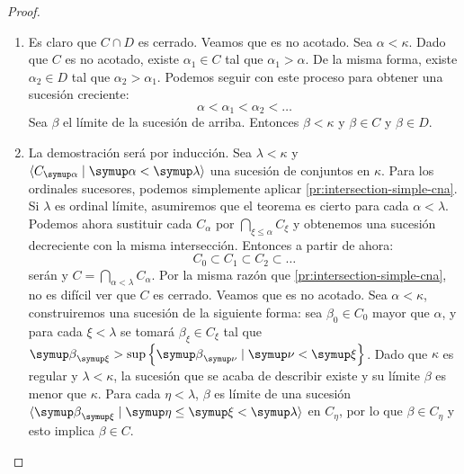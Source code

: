 \begin{proof}\phantom{a}
    \begin{enumerate}[label=(\roman*)]
        \item\label{pr:intersection-simple-cna}
            Es claro que $C\cap D$ es cerrado. Veamos que es no acotado.
            Sea $\alpha<\kappa$. Dado que $C$ es no acotado, existe $\alpha_1\in C$
            tal que $\alpha_1 > \alpha$. De la misma forma, existe $\alpha_2\in D$
            tal que $\alpha_2 > \alpha_1$. Podemos seguir con este proceso para obtener
            una sucesión creciente:
            \[
                \alpha < \alpha_1 < \alpha_2 < \dots
            \]
            Sea $\beta$ el límite de la sucesión de arriba.
            Entonces $\beta < \kappa$ y $\beta\in C$ y $\beta\in D$.


        \item\label{pr:intersection-cna}
            La demostración será por inducción.
            Sea $\lambda<\kappa$ y $\seq{C_\alpha\mid\alpha<\lambda}$
            una sucesión de conjuntos \cna{} en $\kappa$.
            Para los ordinales sucesores, podemos simplemente aplicar
            \ref{pr:intersection-simple-cna}.
            Si $\lambda$ es ordinal límite, asumiremos que el teorema
            es cierto para cada $\alpha<\lambda$. Podemos ahora sustituir
            cada $C_\alpha$ por $\bigcap_{\xi\leq\alpha} C_\xi$ y obtenemos
            una sucesión decreciente con la misma intersección. Entonces a partir de ahora:
            \[
                C_0 \subset C_1 \subset C_2 \subset \dots
            \]
            serán \cna{} y $C = \bigcap_{\alpha<\lambda} C_\alpha$.
            Por la misma razón que \ref{pr:intersection-simple-cna}, no es difícil
            ver que $C$ es cerrado. Veamos que es no acotado. Sea $\alpha<\kappa$,
            construiremos una sucesión de la siguiente forma: sea $\beta_0\in C_0$ mayor que
            $\alpha$, y para cada $\xi<\lambda$ se tomará $\beta_\xi\in C_\xi$
            tal que $\beta_\xi > \sup\set{\beta_\nu\mid\nu<\xi}$.
            Dado que $\kappa$ es regular y $\lambda<\kappa$, la sucesión que se acaba de
            describir existe y su límite $\beta$ es menor que $\kappa$.
            Para cada $\eta<\lambda$, $\beta$ es límite de una sucesión
            $\seq{\beta_\xi\mid\eta\leq\xi<\lambda}$ en $C_\eta$, por lo que
            $\beta\in C_\eta$ y esto implica $\beta\in C$.



\end{enumerate}
\end{proof}
